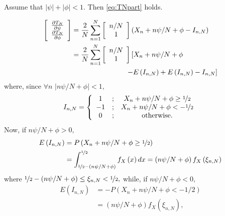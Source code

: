 \documentclass[journal]{IEEEtran}
\begin{document}
\begin{lemma} \label{lem:TNparts}
Assume that $\left\vert \psi\right\vert +\left\vert\phi\right\vert <1$.  Then \eqref{eq:TNpart} holds.
\end{lemma}
\begin{IEEEproof}
\begin{align*}
\left[
\begin{array}
[c]{c}%
\frac{\partial T_{N}}{\partial\psi}\\
\frac{\partial T_{N}}{\partial\phi}%
\end{array}
\right]   &  =\frac{2}{N}\sum_{n=1}^{N}\left[
\begin{array}
[c]{c}%
n/N\\
1
\end{array}
\right]  \left(  X_{n}+n\psi/N+\phi-I_{n,N}\right)  \\
&  =\frac{2}{N}\sum_{n=1}^{N}\left[
\begin{array}
[c]{c}%
n/N\\
1
\end{array}
\right]  \left[  X_{n}+n\psi/N+\phi \right. \\ 
&\left. \hspace{2.7cm} -E\left(  I_{n,N}\right)  +E\left(
I_{n,N}\right)  -I_{n,N}\right]
\end{align*}
where, since $\forall n$ $\left\vert n\psi/N+\phi\right\vert <1,$%
\[
I_{n,N}=\left\{
\begin{array}
[c]{ccc}%
1 & ; & X_{n}+n\psi/N+\phi\geq \nicefrac{1}{2}\\
-1 & ; & X_{n}+n\psi/N+\phi<-\nicefrac{1}{2}\\
0 & ; & \text{otherwise.}%
\end{array}
\right.
\]
Now, if $n\psi/N+\phi>0,$%
\begin{align}
E\left(  I_{n,N}\right)   &  =P\left(  X_{n}+n\psi/N+\phi\geq \nicefrac{1}{2} \right)
\label{eq:one1}\\
&  =\int_{\nicefrac{1}{2}-\left(  n\psi/N+\phi\right)  }^{\nicefrac{1}{2}}f_X \left(  x\right)
dx 
 =\left(  n\psi/N+\phi\right)  f_X \left(  \xi_{n,N}\right) \nonumber
\end{align}
where $\nicefrac{1}{2}-\left(  n\psi/N+\phi\right)  \leq\xi_{n,N} < \nicefrac{1}{2},$ while, if
$n\psi/N+\phi<0,$%
\begin{align}
E\left(  I_{n,N}\right)   &  =-P\left(  X_{n}+n\psi/N+\phi<-1/2\right)
\label{eq:one2}\\
&  =\left(  n\psi/N+\phi\right)  f_X \left(  \xi_{n,N}\right)  ,\nonumber
\end{align}

\end{IEEEproof}
\end{document}

